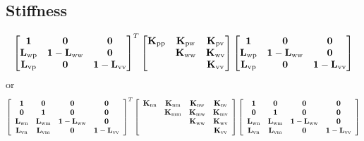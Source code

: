 \subsection{Stiffness}
\[
\begin{bmatrix}
\mathbf{1}  & \mathbf{0} & \mathbf{0} \\ 
\mathbf{L}_{\rm wp} & \mathbf{1} - \mathbf{L}_{\rm ww} & \mathbf{0} \\
\mathbf{L}_{\rm vp} & \mathbf{0} & \mathbf{1}-\mathbf{L}_{\rm vv}
\end{bmatrix}^T
\begin{bmatrix}
    \mathbf{K}_{\rm pp} & \mathbf{K}_{\rm pw} & \mathbf{K}_{\rm pv} \\
   &\mathbf{K}_{\rm ww} & \mathbf{K}_{\rm wv} \\
 && \mathbf{K}_{\rm vv}
\end{bmatrix}
\begin{bmatrix}
\mathbf{1}  & \mathbf{0} & \mathbf{0} \\ 
\mathbf{L}_{\rm wp} & \mathbf{1} - \mathbf{L}_{\rm ww} & \mathbf{0} \\
\mathbf{L}_{\rm vp} & \mathbf{0} & \mathbf{1}-\mathbf{L}_{\rm vv}
\end{bmatrix}
\]
or
$$
\left[\begin{array}{cccc}
\mathbf{1} & \mathbf{0} & \mathbf{0} & \mathbf{0} \\
\mathbf{0} & \mathbf{1} & \mathbf{0} & \mathbf{0} \\
\mathbf{L}_{\rm wn} & \mathbf{L}_{\rm wm} & \mathbf{1}-\mathbf{L}_{\rm ww} & \mathbf{0} \\
\mathbf{L}_{\rm vn} & \mathbf{L}_{\rm vm} & \mathbf{0} & \mathbf{1}-\mathbf{L}_{\rm vv}
\end{array}\right]^T
\left[\begin{array}{cccc}
\mathbf{K}_{\rm n n} & \mathbf{K}_{\rm n m} & \mathbf{K}_{\rm n w} & \mathbf{K}_{\rm n v} \\
& \mathbf{K}_{\rm m m} & \mathbf{K}_{\rm m w} & \mathbf{K}_{\rm m v} \\
& & \mathbf{K}_{\rm w w} & \mathbf{K}_{\rm w v} \\
& & & \mathbf{K}_{\rm v v}
\end{array}\right]
\left[\begin{array}{cccc}
\mathbf{1} & \mathbf{0} & \mathbf{0} & \mathbf{0} \\
\mathbf{0} & \mathbf{1} & \mathbf{0} & \mathbf{0} \\
\mathbf{L}_{\rm wn} & \mathbf{L}_{\rm wm} & \mathbf{1}-\mathbf{L}_{\rm ww} & \mathbf{0} \\
\mathbf{L}_{\rm vn} & \mathbf{L}_{\rm vm} & \mathbf{0} & \mathbf{1}-\mathbf{L}_{\rm vv}
\end{array}\right]
$$
